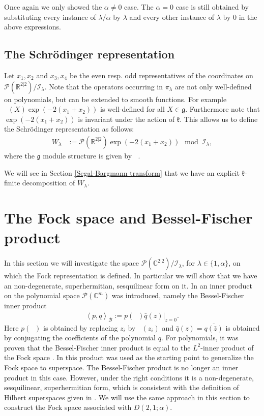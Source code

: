 \documentclass{amsart}
\numberwithin{theorem}{section}
\theoremstyle{definition}
\theoremstyle{remark}
\def\C{\mathds{C} }
\DeclareMathOperator{\bessel}{\mathcal B_\lambda}
\newcommand{\bfip}[1]{\left<{#1}\right>_\mathcal B}
\newcommand{\mf}[1]{\mathfrak{#1}}
\newcommand{\mc}[1]{\mathcal{#1}}
\newcommand{\mg}{{\mathfrak{g}}}
\DeclareMathOperator{\pil}{\pi_\lambda}
\newcommand{\Ila}{\mc I_\lambda}
\begin{document}
Once again we only showed the $\alpha\neq 0$ case. The $\alpha=0$ case is still obtained by substituting every instance of $\lambda/\alpha$ by $\lambda$ and every other instance of $\lambda$ by $0$ in the above expressions.

\subsection{The Schr\"odinger representation}\label{ssSchrod}
Let $x_1,x_2$ and $x_3,x_4$ be the even resp. odd representatives of the coordinates on $\mc{P} (\mathds{R}^{2 |2}) / \mc{I}_\lambda$. Note that the operators occurring in $\pi_\lambda$ are not only well-defined on polynomials, but can be extended to smooth functions. For example $\pil (X) \exp(-2(x_1+x_2))$ is well-defined for all $X\in \mg$. Furthermore note that $\exp(-2(x_1+x_2))$ is invariant under the action of $\mf{k}$. This allows us to define the Schr\"odinger representation as follows:
\begin{align*}
W_\lambda &:= \mc{P}(\mathds{R}^{2|2}  )\exp(-2(x_1+x_2)) \mod \Ila,
\end{align*}
where the $\mf g$ module structure is given by $\pil$.

We will see in Section \ref{Segal-Bargmann transform} that we have an explicit $\mf{k}$-finite decomposition of $W_\lambda$.

\section{The Fock space and Bessel-Fischer product}
\label{Section Fock space}
In this section we will investigate the space $\mc{P} (\C^{2|2}) / \Ila$, for $\lambda \in \{1,\alpha\}$, on which the Fock representation is defined. In particular we will show that we have an non-degenerate, superhermitian, sesquilinear form on it. 
In \cite[Section 2.3]{HKMO} an inner product on the polynomial space $\mc P(\C^m)$ was introduced, namely the Bessel-Fischer inner product 
\begin{align*}
\bfip{p,q} := \left. p(\bessel)\bar q(z)\right|_{z=0}.
\end{align*}
Here $p(\bessel)$ is obtained by replacing $z_i$ by $\bessel (z_i)$ and $\bar q(z) = \overline{q(\bar z)}$ is obtained by conjugating the coefficients of the polynomial $q$. For polynomials, it was proven that the Bessel-Fischer inner product is equal to the $L^2$-inner product of the Fock space \cite[Proposition 2.6]{HKMO}. In \cite{BCD} this product was used as the starting point to generalize the Fock space to superspace. The Bessel-Fischer product is no longer an inner product in this case. However, under the right conditions it is a non-degenerate, sesquilinear, superhermitian form, which is consistent with the definition of Hilbert superspaces given in \cite{dGM}. We will use the same approach in this section to construct the Fock space associated with $D(2,1;\alpha)$.
\end{document}
